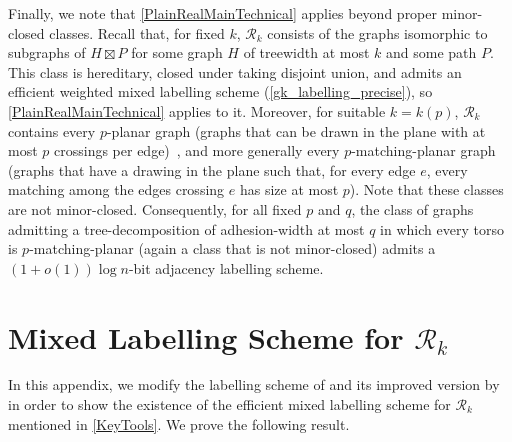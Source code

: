 \documentclass{patmorin}
\begin{document}
Finally, we note that \cref{PlainRealMainTechnical} applies beyond proper
minor-closed classes. Recall that, for fixed $k$, $\mathcal{R}_k$ consists of
the graphs isomorphic to subgraphs of $H\boxtimes P$ for some graph $H$ of
treewidth at most $k$ and some path $P$. This class is hereditary, closed
under taking disjoint union, and admits an efficient weighted mixed labelling
scheme (\cref{gk_labelling_precise}), so \cref{PlainRealMainTechnical} applies
to it. Moreover, for suitable $k=k(p)$, $\mathcal{R}_k$ contains every
$p$-planar graph (graphs that can be drawn in the plane with at most $p$
crossings per edge)~\citep{dujmovic.morin.ea:graph}, and more generally every
$p$-matching-planar graph~\citep{DBLP:journals/corr/abs-2507-22395} (graphs that have a drawing in the plane such that, for every edge $e$, every
matching among the edges crossing $e$ has size at most $p$). Note that these classes are not minor-closed. Consequently, for all fixed $p$ and $q$, the class of graphs admitting a tree-decomposition of adhesion-width at most $q$ in which every
torso is $p$-matching-planar (again a class that is not minor-closed)
 admits a $(1+o(1))\log n$-bit adjacency labelling scheme.



\setlength{\bibsep}{0.3ex plus 0.1ex minus 0.1ex}



\appendix
{}

\section{Mixed Labelling Scheme for \texorpdfstring{$\mathcal{R}_k$}{Rk}}
\label{weighted_product_proof}

In this appendix, we modify the labelling scheme of \citet{dujmovic.esperet.ea:adjacency} and its improved version by \citet{gawrychowski.janczewski:simpler} in order to show the existence of the efficient mixed labelling scheme for $\mathcal{R}_k$ mentioned in \cref{KeyTools}.  We prove the following result.
\end{document}
